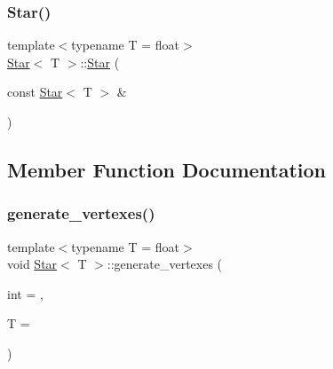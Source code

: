 \mbox{\label{classStar_a047ce2a8d4fb409858555aee98b33c93}} 
\subsubsection{\texorpdfstring{Star()}{Star()}\hspace{0.1cm}{\footnotesize\ttfamily [8/8]}}
{\footnotesize\ttfamily template$<$typename T  = float$>$ \\
\mbox{\hyperlink{classStar}{Star}}$<$ T $>$\+::\mbox{\hyperlink{classStar}{Star}} (\begin{DoxyParamCaption}\item[{const \mbox{\hyperlink{classStar}{Star}}$<$ T $>$ \&}]{ }\end{DoxyParamCaption})\hspace{0.3cm}{\ttfamily [default]}}



\subsection{Member Function Documentation}
\mbox{\label{classStar_ac9ce42a8f7289484594f7f0ab5124849}} 
\subsubsection{\texorpdfstring{generate\+\_\+vertexes()}{generate\_vertexes()}\hspace{0.1cm}{\footnotesize\ttfamily [1/6]}}
{\footnotesize\ttfamily template$<$typename T  = float$>$ \\
void \mbox{\hyperlink{classStar}{Star}}$<$ T $>$\+::generate\+\_\+vertexes (\begin{DoxyParamCaption}\item[{int}]{ = {},  }\item[{T}]{ = {} }\end{DoxyParamCaption})\hspace{0.3cm}{\ttfamily [private]}}

\mbox{\label{classStar_ac9ce42a8f7289484594f7f0ab5124849}} 
